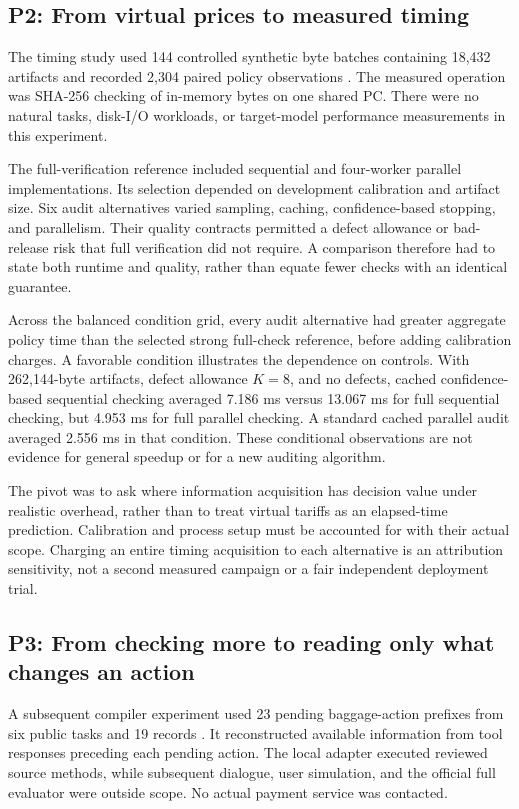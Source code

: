 \documentclass[10pt,twocolumn,letterpaper]{article}
\begin{document}
\subsection{P2: From virtual prices to measured timing}
The timing study used 144 controlled synthetic byte batches containing 18,432 artifacts and recorded 2,304 paired policy observations \cite{pfmeasured}. The measured operation was SHA-256 checking of in-memory bytes on one shared PC. There were no natural tasks, disk-I/O workloads, or target-model performance measurements in this experiment.

The full-verification reference included sequential and four-worker parallel implementations. Its selection depended on development calibration and artifact size. Six audit alternatives varied sampling, caching, confidence-based stopping, and parallelism. Their quality contracts permitted a defect allowance or bad-release risk that full verification did not require. A comparison therefore had to state both runtime and quality, rather than equate fewer checks with an identical guarantee.

Across the balanced condition grid, every audit alternative had greater aggregate policy time than the selected strong full-check reference, before adding calibration charges. A favorable condition illustrates the dependence on controls. With 262,144-byte artifacts, defect allowance $K=8$, and no defects, cached confidence-based sequential checking averaged 7.186 ms versus 13.067 ms for full sequential checking, but 4.953 ms for full parallel checking. A standard cached parallel audit averaged 2.556 ms in that condition. These conditional observations are not evidence for general speedup or for a new auditing algorithm.

The pivot was to ask where information acquisition has decision value under realistic overhead, rather than to treat virtual tariffs as an elapsed-time prediction. Calibration and process setup must be accounted for with their actual scope. Charging an entire timing acquisition to each alternative is an attribution sensitivity, not a second measured campaign or a fair independent deployment trial.

\subsection{P3: From checking more to reading only what changes an action}
A subsequent compiler experiment used 23 pending baggage-action prefixes from six public tasks and 19 records \cite{pfcompiler}. It reconstructed available information from tool responses preceding each pending action. The local adapter executed reviewed source methods, while subsequent dialogue, user simulation, and the official full evaluator were outside scope. No actual payment service was contacted.
\end{document}
